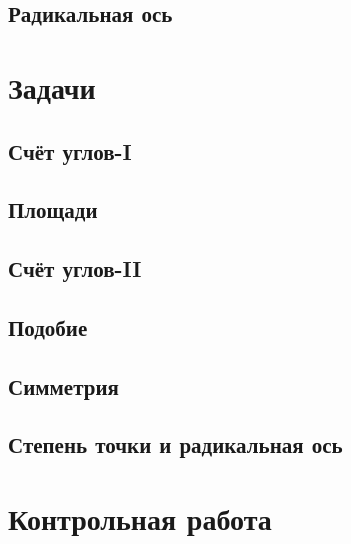 \documentclass[twoside]{article}
\begin{document}
\subsection{Радикальная ось}


\newpage
\renewcommand{\thesubsection}{\roman{subsection}}
\setcounter{subsection}{0}

\section*{Задачи}
\subsection{Счёт углов-I}

\subsection{Площади}
% 
\subsection{Счёт углов-II}


\subsection{Подобие}
% 
\subsection{Симметрия}
% 
\subsection{Степень точки и радикальная ось}


\newpage
{}
\section*{Контрольная работа}
% 
\end{document}
